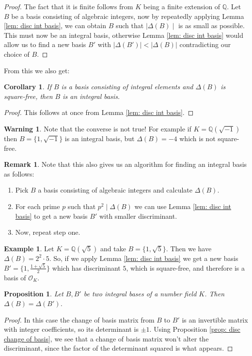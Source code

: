 \documentclass[11pt,a4paper]{report}
\theoremstyle{plain}
\newtheorem{cor}[subsection]{Corollary}
\newtheorem{prop}[subsection]{Proposition}
\theoremstyle{definition}
\newtheorem{exmp}[subsection]{Example}
\theoremstyle{definition}
\newtheorem{rmrk}[subsection]{Remark}
\newtheorem{warn}[subsection]{Warning}
\def\QQ{\mathbb{Q}}
\def \OO {\mathcal{O}}
\begin{document}
\begin{proof}
	The fact that it is finite follows from $K$ being a finite extension of $\QQ$.	
	Let $B$ be a basis consisting of algebraic integers, now by repeatedly applying Lemma \ref{lem: disc int basis}, we can obtain $B$ such that $\mid \Delta(B) \mid $ is as small as possible. This must now be an integral basis, otherwise Lemma \ref{lem: disc int basis} would allow us to find a new basis $B'$ with $|\Delta(B')| < |\Delta(B)|$ contradicting our choice of $B$. 
\end{proof}

From this we also get:
\begin{cor}\label{cor: square free implies int basis}
	If $B$ is a basis consisting of integral elements and $\Delta(B)$ is square-free, then $B$ is an integral basis.
\end{cor}

\begin{proof}
	This follows at once from Lemma \ref{lem: disc int basis}.
\end{proof}


\begin{warn}
	Note that the converse is not true! For example if $K=\QQ(\sqrt{-1})$ then $B=\{1,\sqrt{-1}\}$ is an integral basis, but $\Delta(B)=-4$ which is not square-free.
\end{warn}
\begin{rmrk}
	Note that this also gives us an algorithm for finding an integral basis as follows:
	\begin{enumerate}
		\item Pick $B$ a basis consisting of algebraic integers and calculate $\Delta(B)$.
		\item For each prime $p$ such that $p^2 \mid \Delta(B)$ we can use Lemma \ref{lem: disc int basis} to get a new basis $B'$ with smaller discriminant.
		\item Now, repeat step one.
	\end{enumerate}
\end{rmrk}

\begin{exmp}
	Let $K=\QQ(\sqrt{5})$ and take $B=\{1,\sqrt{5}\}$. Then we have $\Delta(B)=2^2\cdot5$. So, if we apply Lemma \ref{lem: disc int basis} we get a new basis $B'=\{1,\frac{1+\sqrt{5}}{2}\}$ which has discriminant $5$, which is square-free, and therefore is  a basis of $\OO_K$.
\end{exmp}



\begin{prop}\label{prop: int bases disc}
	Let $B,B'$ be two integral bases of a number field $K$. Then $\Delta(B)= \Delta(B')$.
\end{prop}
\begin{proof}
	In this case the change of basis matrix from $B$ to $B'$ is an invertible matrix with integer coefficients, so its determinant is $\pm 1$. Using Proposition \ref{prop: disc change of basis}, we see that a change of basis matrix won't alter the discriminant, since the factor of the determinant squared is what appears.
	
	
\end{proof}
\end{document}
